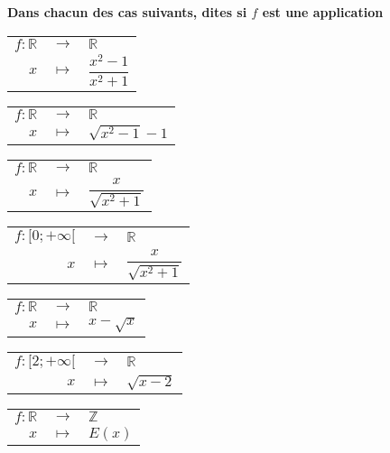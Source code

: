 \documentclass{article}
\begin{document}
 \quad \textbf{Dans chacun des cas suivants, dites si $f$ est une application}

\bigskip

\noindent
\begin{multicols}{3}
\noindent
\renewcommand{\arraystretch}{1.3} %
\begin{tabular}{rcl}
    $f : \mathbb{R}$ & $\to$ & $\mathbb{R}$ \\
    $x$ & $\mapsto$ & $\dfrac{x^2 - 1}{x^2 + 1}$
\end{tabular}

\bigskip

\begin{tabular}{rcl}
    $f : \mathbb{R}$ & $\to$ & $\mathbb{R}$ \\
    $x$ & $\mapsto$ & $\sqrt{x^2 - 1} - 1$
\end{tabular}

\columnbreak

\begin{tabular}{rcl}
    $f : \mathbb{R}$ & $\to$ & $\mathbb{R}$ \\
    $x$ & $\mapsto$ & $\dfrac{x}{\sqrt{x^2+1}}$
\end{tabular}

\bigskip

\begin{tabular}{rcl}
    $f : [0; +\infty[$ & $\to$ & $\mathbb{R}$ \\
    $x$ & $\mapsto$ & $\dfrac{x}{\sqrt{x^2+1}}$
\end{tabular}

\columnbreak

\begin{tabular}{rcl}
    $f : \mathbb{R}$ & $\to$ & $\mathbb{R}$ \\
    $x$ & $\mapsto$ & $x - \sqrt{x}$
\end{tabular}

\bigskip

\begin{tabular}{rcl}
    $f : [2; +\infty[$ & $\to$ & $\mathbb{R}$ \\
    $x$ & $\mapsto$ & $\sqrt{x - 2}$
\end{tabular}

\bigskip

\begin{tabular}{rcl}
    $f : \mathbb{R}$ & $\to$ & $\mathbb{Z}$ \\
    $x$ & $\mapsto$ & $E(x)$
\end{tabular}

\end{multicols}
\end{document}
